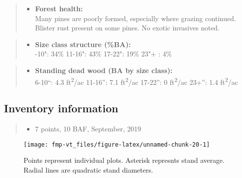 \documentclass[]{tufte-handout}
\providecommand{\tightlist}{%
  \setlength{\itemsep}{0pt}\setlength{\parskip}{0pt}}
\begin{document}
\begin{quote}
\begin{itemize}
\tightlist
\item
  \textbf{Forest health:}\\
  \vspace{2pt} Many pines are poorly formed, especially where grazing
  continued. Blister rust present on some pines. No exotic invasives
  noted.
\end{itemize}
\end{quote}

\begin{quote}
\begin{itemize}
\tightlist
\item
  \textbf{Size class structure (\%BA):}\\
  \vspace{2pt} -10": 34\% \textbar{} 11-16": 43\% \textbar{}
  17-22": 19\% \textbar{} 23"+ : 4\%
\end{itemize}
\end{quote}

\begin{quote}
\begin{itemize}
\tightlist
\item
  \textbf{Standing dead wood (BA by size class):}\\
  \vspace{2pt} \indent \small 6-10``: 4.3 ft\textsuperscript{2}/ac
  \textbar{} 11-16'': 7.1 ft\textsuperscript{2}/ac \textbar{} 17-22'': 0
  ft\textsuperscript{2}/ac \textbar{} 23+'': 1.4
  ft\textsuperscript{2}/ac
\end{itemize}
\end{quote}

\subsection{Inventory information}\label{inventory-information-3}

\begin{quote}
\begin{itemize}
\tightlist
\item
  7 points, 10 BAF, September, 2019
\end{itemize}
\end{quote}

\begin{figure}
\texttt{[image: fmp-vt\_files/figure-latex/unnamed-chunk-20-1]} \caption[Points represent individual plots]{Points represent individual plots. Asterisk represnts stand average. Radial lines are quadratic stand diameters.}\label{fig:unnamed-chunk-20}
\end{figure}
\end{document}

